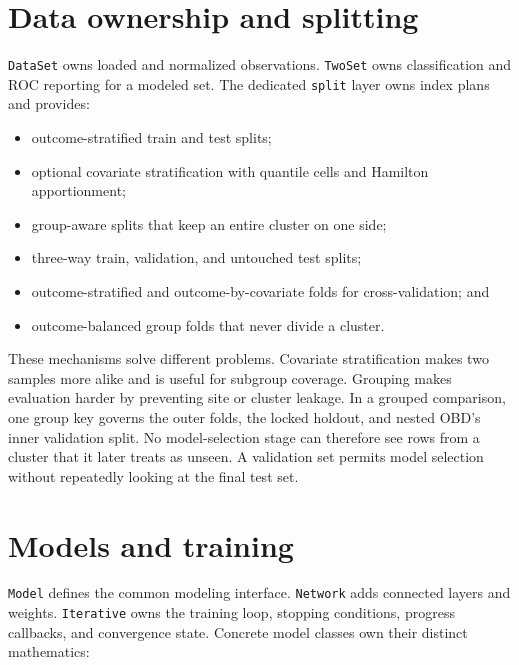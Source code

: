 \section{Data ownership and splitting}

\texttt{DataSet} owns loaded and normalized observations.
\texttt{TwoSet} owns classification and ROC reporting for a modeled
set.  The dedicated \texttt{split} layer owns index plans and provides:

\begin{itemize}
\item outcome-stratified train and test splits;
\item optional covariate stratification with quantile cells and
Hamilton apportionment;
\item group-aware splits that keep an entire cluster on one side;
\item three-way train, validation, and untouched test splits;
\item outcome-stratified and outcome-by-covariate folds for
cross-validation; and
\item outcome-balanced group folds that never divide a cluster.
\end{itemize}

These mechanisms solve different problems.  Covariate stratification
makes two samples more alike and is useful for subgroup coverage.
Grouping makes evaluation harder by preventing site or cluster
leakage.  In a grouped comparison, one group key governs the outer
folds, the locked holdout, and nested OBD's inner validation split.
No model-selection stage can therefore see rows from a cluster that it
later treats as unseen.  A validation set permits model selection
without repeatedly looking at the final test set.

\section{Models and training}

\texttt{Model} defines the common modeling interface.
\texttt{Network} adds connected layers and weights.
\texttt{Iterative} owns the training loop, stopping conditions,
progress callbacks, and convergence state.  Concrete model classes own
their distinct mathematics:

